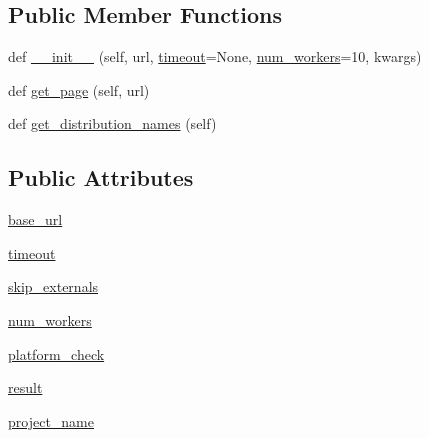 \subsection*{Public Member Functions}
\begin{DoxyCompactItemize}
\item 
def \hyperlink{classpip_1_1__vendor_1_1distlib_1_1locators_1_1SimpleScrapingLocator_a86eb1e08c1ec1fc9e5a3edcf92c923db}{\+\_\+\+\_\+init\+\_\+\+\_\+} (self, url, \hyperlink{classpip_1_1__vendor_1_1distlib_1_1locators_1_1SimpleScrapingLocator_a4d515374c6b8f51e803eef2375a6f2f0}{timeout}=None, \hyperlink{classpip_1_1__vendor_1_1distlib_1_1locators_1_1SimpleScrapingLocator_a36b92458b635ce89cbee73f0f3551156}{num\+\_\+workers}=10, kwargs)
\item 
def \hyperlink{classpip_1_1__vendor_1_1distlib_1_1locators_1_1SimpleScrapingLocator_aba4b0806b56eebef291b3f33623f28b7}{get\+\_\+page} (self, url)
\item 
def \hyperlink{classpip_1_1__vendor_1_1distlib_1_1locators_1_1SimpleScrapingLocator_af143a81384c2795cedaa872936bfa8a5}{get\+\_\+distribution\+\_\+names} (self)
\end{DoxyCompactItemize}
\subsection*{Public Attributes}
\begin{DoxyCompactItemize}
\item 
\hyperlink{classpip_1_1__vendor_1_1distlib_1_1locators_1_1SimpleScrapingLocator_ab15ddbc7ce13679c25ff8949a654d1b8}{base\+\_\+url}
\item 
\hyperlink{classpip_1_1__vendor_1_1distlib_1_1locators_1_1SimpleScrapingLocator_a4d515374c6b8f51e803eef2375a6f2f0}{timeout}
\item 
\hyperlink{classpip_1_1__vendor_1_1distlib_1_1locators_1_1SimpleScrapingLocator_a573c917721a75fb2b613a88de23f245f}{skip\+\_\+externals}
\item 
\hyperlink{classpip_1_1__vendor_1_1distlib_1_1locators_1_1SimpleScrapingLocator_a36b92458b635ce89cbee73f0f3551156}{num\+\_\+workers}
\item 
\hyperlink{classpip_1_1__vendor_1_1distlib_1_1locators_1_1SimpleScrapingLocator_a66e7fb39dbad424ac98724d1d919bc3e}{platform\+\_\+check}
\item 
\hyperlink{classpip_1_1__vendor_1_1distlib_1_1locators_1_1SimpleScrapingLocator_a404af46095eacf38efdf97cff5855b38}{result}
\item 
\hyperlink{classpip_1_1__vendor_1_1distlib_1_1locators_1_1SimpleScrapingLocator_aad70587390d19cbd6df0df4e53d51889}{project\+\_\+name}
\end{DoxyCompactItemize}
